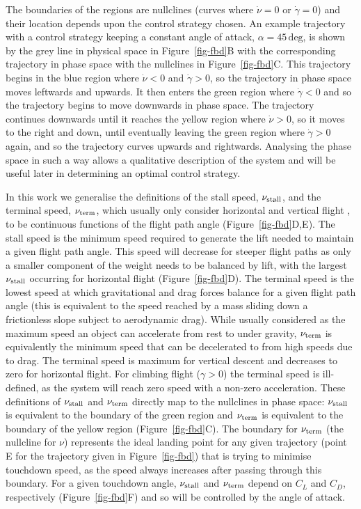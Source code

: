 The boundaries of the regions are nullclines (curves where $\dot{\nu} = 0$ or $\dot{\gamma} = 0$) and their location depends upon the control strategy chosen. An example trajectory with a control strategy keeping a constant angle of attack, $\alpha = 45\,\text{deg}$, is shown by the grey line in physical space in Figure~\ref{fig-fbd}B with the corresponding trajectory in phase space with the nullclines in Figure~\ref{fig-fbd}C. This trajectory begins in the blue region where $\dot{\nu} < 0$ and $\dot{\gamma} > 0$, so the trajectory in phase space moves leftwards and upwards. It then enters the green region where $\dot{\gamma} < 0$ and so the trajectory begins to move downwards in phase space. The trajectory continues downwards until it reaches the yellow region where $\dot{\nu} > 0$, so it moves to the right and down, until eventually leaving the green region where $\dot{\gamma} > 0$ again, and so the trajectory curves upwards and rightwards. Analysing the phase space in such a way allows a qualitative description of the system and will be useful later in determining an optimal control strategy.

In this work we generalise the definitions of the stall speed, $\nu_{\text{stall}}$, and the terminal speed, $\nu_{\text{term}}$, which usually only consider horizontal and vertical flight \cite{andersonIntroductionFlight2008}, to be continuous functions of the flight path angle (Figure~\ref{fig-fbd}D,E). The stall speed is the minimum speed required to generate the lift needed to maintain a given flight path angle. This speed will decrease for steeper flight paths as only a smaller component of the weight needs to be balanced by lift, with the largest $\nu_{\text{stall}}$ occurring for horizontal flight (Figure~\ref{fig-fbd}D). The terminal speed is the lowest speed at which gravitational and drag forces balance for a given flight path angle (this is equivalent to the speed reached by a mass sliding down a frictionless slope subject to aerodynamic drag). While usually considered as the maximum speed an object can accelerate from rest to under gravity, $\nu_{\text{term}}$ is equivalently the minimum speed that can be decelerated to from high speeds due to drag. The terminal speed is maximum for vertical descent and decreases to zero for horizontal flight. For climbing flight ($\gamma > 0$) the terminal speed is ill-defined, as the system will reach zero speed with a non-zero acceleration. These definitions of $\nu_{\text{stall}}$ and $\nu_{\text{term}}$ directly map to the nullclines in phase space: $\nu_{\text{stall}}$ is equivalent to the boundary of the green region and $\nu_{\text{term}}$ is equivalent to the boundary of the yellow region (Figure~\ref{fig-fbd}C). The boundary for $\nu_{\text{term}}$ (the nullcline for $\nu$) represents the ideal landing point for any given trajectory (point E for the trajectory given in Figure~\ref{fig-fbd}) that is trying to minimise touchdown speed, as the speed always increases after passing through this boundary. For a given touchdown angle, $\nu_{\text{stall}}$ and $\nu_{\text{term}}$ depend on $C_L$ and $C_D$, respectively (Figure~\ref{fig-fbd}F) and so will be controlled by the angle of attack.

